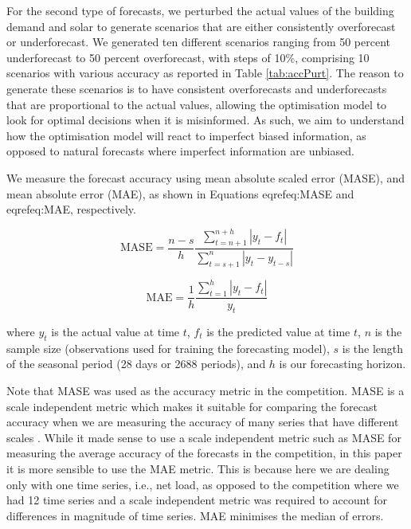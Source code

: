 \documentclass[conference]{IEEEtran}
\begin{document}

For the second type of forecasts, we perturbed the actual values of the building demand and solar to generate scenarios that are either consistently overforecast or underforecast. We generated ten different scenarios ranging from 50 percent underforecast to 50 percent overforecast, with steps of 10\%, comprising 10 scenarios with various accuracy as reported in Table \ref{tab:accPurt}. The reason to generate these scenarios is to have consistent overforecasts and underforecasts that are proportional to the actual values, allowing the optimisation model to look for optimal decisions when it is misinformed. As such, we aim to understand how the optimisation model will react to imperfect biased information, as opposed to natural forecasts where imperfect information are unbiased.

We measure the forecast accuracy using mean absolute scaled error (MASE), and mean absolute error (MAE), as shown in Equations eqref{eq:MASE} and eqref{eq:MAE}, respectively.

\begin{equation}
\text{MASE} = \frac{n-s}{h} \frac{ \sum\nolimits_{t=n+1}^{n+h} {|y_{t}-f_{t}|} } {\sum\nolimits_{t=s+1}^{n} |y_{t}-y_{t-s}|}
\label{eq:MASE}
\end{equation}

\begin{equation}
\text{MAE}= \frac{1}{h} \frac{ \sum\nolimits_{t=1}^{h} {|y_{t}-f_{t}|} } {y_{t}}
\label{eq:MAE}
\end{equation}

	

where $y_{t}$ is the actual value at time $t$, $f_{t}$ is the predicted value at time $t$, $n$ is the sample size (observations used for training the forecasting model), $s$ is the length of the seasonal period (28 days or 2688 periods), and $h$ is our forecasting horizon. 

Note that MASE was used as the accuracy metric in the competition. MASE is a scale independent metric which makes it suitable for comparing the forecast accuracy when we are measuring the accuracy of many series that have different scales \cite{hyndmanfpp3}. While it made sense to use a scale independent metric such as MASE for measuring the average accuracy of the forecasts in the competition, in this paper it is more sensible to use the MAE metric. This is because here we are dealing only with one time series, i.e., net load, as opposed to the competition where we had 12 time series and a scale independent metric was required to account for differences in magnitude of time series. MAE minimises the median of errors.
\end{document}
